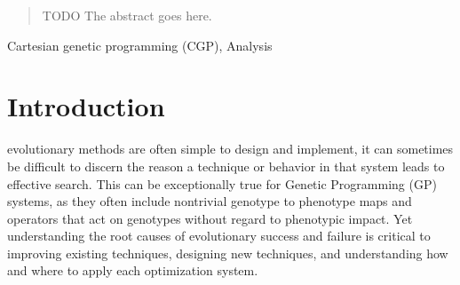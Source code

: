 \documentclass[journal]{IEEEtran}
\begin{document}







\maketitle

\begin{abstract}
TODO The abstract goes here.
\end{abstract}

\begin{IEEEkeywords}
Cartesian genetic programming (CGP), Analysis
\end{IEEEkeywords}






%
\IEEEpeerreviewmaketitle



\section{Introduction}
% 
% 
% 
% 
 evolutionary methods are often simple to design
and implement, it can sometimes be difficult to discern the reason a technique
or behavior in that system leads to effective search.  This can be exceptionally
true for Genetic Programming (GP) systems, as they often include nontrivial
genotype to phenotype maps and operators that act on genotypes without regard to
phenotypic impact.  Yet understanding the root causes of evolutionary success
and failure is critical to improving existing techniques, designing new techniques,
and understanding how and where to apply each optimization system.
\end{document}
